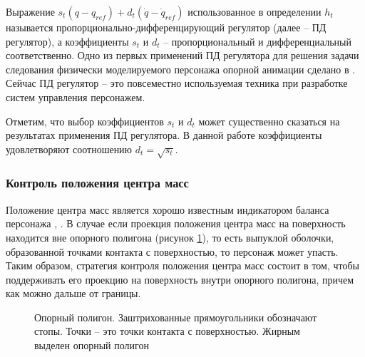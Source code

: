 Выражение $s_{t} (q - q_{ref}) + d_{t} (\dot{q} - \dot{q}_{ref})$ использованное в определении $h_{t}$ называется пропорционально-дифференцирующий регулятор (далее -- ПД регулятор), а коэффициенты $s_{t}$ и $d_{t}$ -- пропорциональный и дифференциальный соответственно. Одно из первых применений ПД регулятора для решения задачи следования физически моделируемого персонажа опорной анимации сделано в \cite{HodginsWBO}. Сейчас ПД регулятор -- это повсеместно используемая техника при разработке систем управления персонажем.

Отметим, что выбор коэффициентов $s_{t}$ и $d_{t}$ может существенно сказаться на результатах применения ПД регулятора. В данной работе коэффициенты удовлетворяют соотношению $d_{t} = \sqrt{s_{t}}$.

\subsubsection{Контроль положения центра масс}

Положение центра масс является хорошо известным индикатором баланса персонажа \cite{AbeSP}, \cite{MacchiettoZS}. В случае если проекция положения центра масс на поверхность находится вне опорного полигона (рисунок \ref{fig:support_polygon}), то есть выпуклой оболочки, образованной точками контакта с поверхностью, то персонаж может упасть. Таким образом, стратегия контроля положения центра масс состоит в том, чтобы поддерживать его проекцию на поверхность внутри опорного полигона, причем как можно дальше от границы.

\begin{figure}[ht]
  \begin{minipage}{\textwidth}
    \centering
    \caption{Опорный полигон. Заштрихованные прямоугольники обозначают стопы. Точки -- это точки контакта с поверхностью. Жирным выделен опорный полигон}
    \label{fig:support_polygon}
  \end{minipage}
\end{figure}

